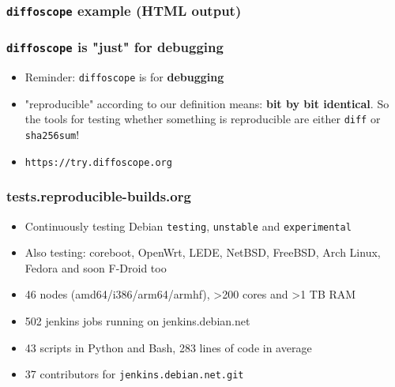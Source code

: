 \documentclass[14pt,aspectratio=169]{beamer}
\newif\ifplacelogo
\begin{document}
{\begin{frame}
 \frametitle{\texttt{diffoscope} example (HTML output)}
\end{frame}


\begin{frame}
 \frametitle{\texttt{diffoscope} is "just" for debugging}

 \begin{itemize}
  \item Reminder: \texttt{diffoscope} is for \textbf{debugging}
  \item "reproducible" according to our definition means: \textbf{bit by bit
  identical}. So the tools for testing whether something is reproducible are
  either \texttt{diff} or \texttt{sha256sum}!
  \item<2> \texttt{https://try.diffoscope.org}
 \end{itemize}
\end{frame}

}



\placelogotrue


\begin{frame}
 \frametitle{tests.reproducible-builds.org}

 \begin{itemize}
  \item Continuously testing Debian \texttt{testing}, \texttt{unstable} and
  \texttt{experimental}
  \item Also testing: coreboot, OpenWrt, LEDE, NetBSD, FreeBSD,
  Arch Linux, Fedora and soon F-Droid too
  \item 46 nodes (amd64/i386/arm64/armhf), >200 cores and >1 TB RAM
  \item 502 jenkins jobs running on jenkins.debian.net
  \item 43 scripts in Python and Bash, 283 lines of code in average
  \item 37 contributors for \texttt{jenkins.debian.net.git}
 \end{itemize}
\end{frame}
\end{document}
